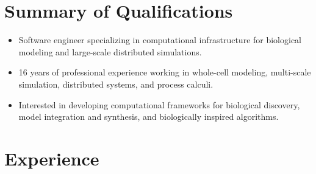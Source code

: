 
\makecvtitle

\section{Summary of Qualifications}

\begin{itemize}
\item Software engineer specializing in computational infrastructure for biological modeling and large-scale distributed simulations.
\item 16 years of professional experience working in whole-cell modeling, multi-scale simulation, distributed systems, and process calculi. 
\item Interested in developing computational frameworks for biological discovery, model integration and synthesis, and biologically inspired algorithms. 
\end{itemize}

\section{Experience}


